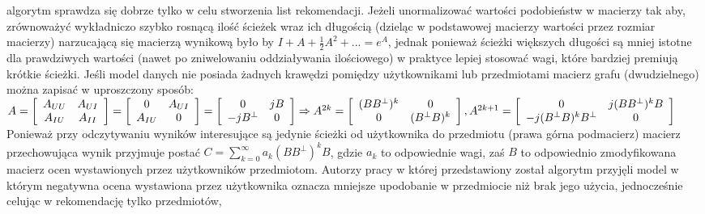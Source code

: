 \documentclass{pracamgr}
\begin{document}
    algorytm sprawdza się dobrze tylko w celu stworzenia list rekomendacji.
    Jeżeli unormalizować wartości podobieństw w macierzy tak aby, zrównoważyć wykładniczo szybko rosnącą ilość ścieżek wraz ich długością
    (dzieląc w podstawowej macierzy wartości przez rozmiar macierzy) narzucającą się macierzą wynikową było by $I+A+\frac{1}{2}A^2+...=e^{A}$,
    jednak ponieważ ścieżki większych długości są mniej istotne dla prawdziwych wartości (nawet po zniwelowaniu oddziaływania ilościowego)
    w praktyce lepiej stosować wagi, które bardziej premiują krótkie ścieżki.
    Jeśli model danych nie posiada żadnych krawędzi pomiędzy użytkownikami lub przedmiotami macierz grafu (dwudzielnego)
    można zapisać w uproszczony sposób:\newline
    $A=
     \left[\begin{array}{cc}
     A_{UU}&A_{UI}\\
     A_{IU}&A_{II}
     \end{array}\right]
     =
     \left[\begin{array}{cc}
     0&A_{UI}\\
     A_{IU}&0
     \end{array}\right]
     =
     \left[\begin{array}{cc}
     0&jB\\
     -jB^\bot&0
     \end{array}\right]
     \Rightarrow\newline
     A^{2k}=
     \left[\begin{array}{cc}
     (BB^\bot)^k&0\\
     0&(B^\bot B)^k
     \end{array}\right],
     A^{2k+1}=
     \left[\begin{array}{cc}
     0&j(BB^\bot)^kB\\
     -j(B^\bot B)^kB^\bot&0
     \end{array}\right]
    $\newline
    Ponieważ przy odczytywaniu wyników interesujące są jedynie ścieżki od użytkownika do przedmiotu (prawa górna podmacierz)
    macierz przechowująca wynik przyjmuje postać $C=\sum\limits_{k=0}^{\infty}a_k(BB^\bot)^kB$, gdzie $a_k$ to odpowiednie wagi,
    zaś $B$ to odpowiednio zmodyfikowana macierz ocen wystawionych przez użytkowników przedmiotom.
    Autorzy pracy w której przedstawiony został algorytm przyjęli model w którym negatywna ocena wystawiona przez użytkownika
    oznacza mniejsze upodobanie w przedmiocie niż brak jego użycia, jednocześnie celując w rekomendację tylko przedmiotów,
\end{document}
